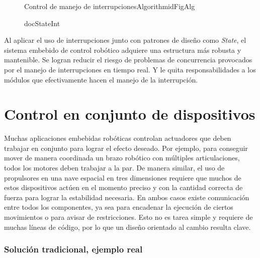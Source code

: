 \begin{figure}
\caption{Documentación de la aplicación del patron \textit{State} para el ejemplo del manejador de interrupciones.}
\caption{docStateInt}

\begin{pattern}[]{Control de manejo de interrupciones}{Algorithm}{idFigAlg}
\assigns
{}

\end{pattern}
\end{figure}


Al aplicar el uso de interrupciones junto con patrones de diseño como \textit{State}, el sistema embebido de control robótico adquiere una estructura más robusta y mantenible. Se logran reducir el riesgo de problemas de concurrencia provocados por el manejo de interrupciones en tiempo real. Y le quita responsabilidades a los módulos que efectivamente hacen el manejo de la interrupción.



\section{Control en conjunto de dispositivos}
Muchas aplicaciones embebidas robóticas controlan \gls{actuadores} que deben trabajar en conjunto para lograr el efecto deseado. Por ejemplo, para conseguir mover de manera coordinada un brazo robótico con múltiples articulaciones, todos los motores deben trabajar a la par. De manera similar, el uso de propulsores en una nave espacial en tres dimensiones requiere que muchos de estos dispositivos actúen en el momento preciso y con la cantidad correcta de fuerza para lograr la estabilidad necesaria. En ambos casos existe comunicación entre todos los componentes, ya sea para encadenar la ejecución de ciertos movimientos o para avisar de restricciones. Esto no es tarea simple y requiere de muchas líneas de código, por lo que un diseño orientado al cambio resulta clave.

\subsubsection*{Solución tradicional, ejemplo real}

